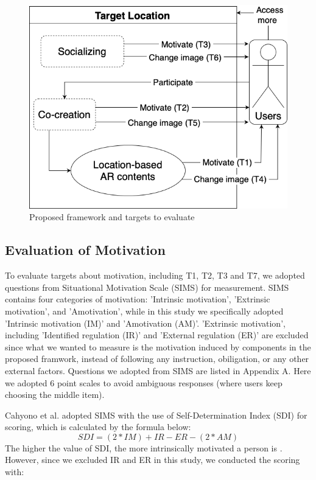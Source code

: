 \begin{figure}[ht]
  \centering
  \includegraphics[width=0.8\columnwidth]{resources/5_experiment_and_results/proposed_framework_with_evaluation_targets.png}
    \caption{Proposed framework and targets to evaluate}
\end{figure}

\subsection{Evaluation of Motivation}

To evaluate targets about motivation, including T1, T2, T3 and T7, we adopted questions from Situational Motivation Scale (SIMS) \cite{guay_vallerand_blanchard_2000} for measurement.
SIMS contains four categories of motivation: 'Intrinsic motivation', 'Extrinsic motivation', and 'Amotivation', while in this study we specifically adopted 'Intrinsic motivation (IM)' and 'Amotivation (AM)'.
'Extrinsic motivation', including 'Identified regulation (IR)' and 'External regulation (ER)' are excluded since what we wanted to measure is the motivation induced by components in the proposed framwork, instead of following any instruction, obiligation, or any other external factors.
Questions we adopted from SIMS are listed in Appendix A.
Here we adopted 6 point scales to avoid ambiguous responses (where users keep choosing the middle item).

Cahyono et al. adopted SIMS with the use of Self-Determination Index (SDI) for scoring, which is calculated by the formula below:
\[ SDI = (2 * IM) + IR - ER - (2 * AM) \]
The higher the value of SDI, the more intrinsically motivated a person is \cite{cahyono_ludwig_2017}.
However, since we excluded IR and ER in this study, we conducted the scoring with:

